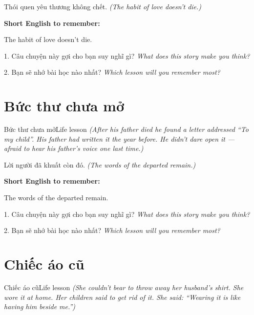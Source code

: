 \begin{baihoc}
Thói quen yêu thương không chết.
\textit{(The habit of love doesn't die.)}
\end{baihoc}

\begin{ghinhoanh}
\textbf{Short English to remember:}

The habit of love doesn't die.

\end{ghinhoanh}

\begin{tuhocnhanh}
1. Câu chuyện này gợi cho bạn suy nghĩ gì? \textit{What does this story make you think?}

2. Bạn sẽ nhớ bài học nào nhất? \textit{Which lesson will you remember most?}
\end{tuhocnhanh}
\ngancach


\section{Bức thư chưa mở}
\begin{truyen}{Bức thư chưa mở}{Life lesson}
\textit{(After his father died he found a letter addressed ``To my child''. His father had written it the year before. He didn't dare open it — afraid to hear his father's voice one last time.)}
\end{truyen}

\begin{baihoc}
Lời người đã khuất còn đó.
\textit{(The words of the departed remain.)}
\end{baihoc}

\begin{ghinhoanh}
\textbf{Short English to remember:}

The words of the departed remain.

\end{ghinhoanh}

\begin{tuhocnhanh}
1. Câu chuyện này gợi cho bạn suy nghĩ gì? \textit{What does this story make you think?}

2. Bạn sẽ nhớ bài học nào nhất? \textit{Which lesson will you remember most?}
\end{tuhocnhanh}
\ngancach


\section{Chiếc áo cũ}
\begin{truyen}{Chiếc áo cũ}{Life lesson}
\textit{(She couldn't bear to throw away her husband's shirt. She wore it at home. Her children said to get rid of it. She said: ``Wearing it is like having him beside me.'')}
\end{truyen}

